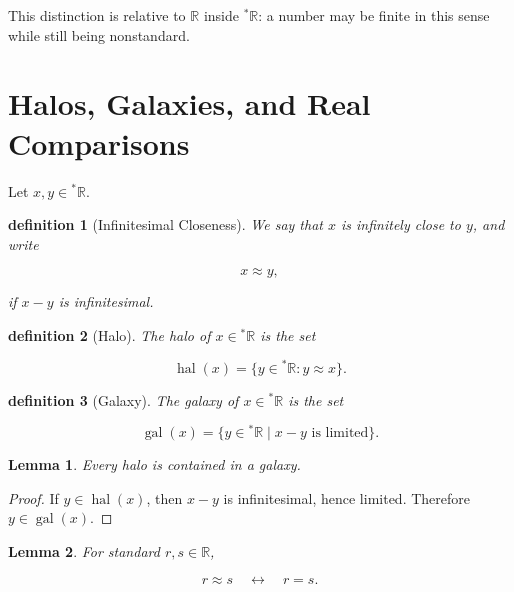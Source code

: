 \documentclass[10pt,a4paper]{book}
\newtheorem{definition}{definition}[section]
\newtheorem{lemma}{Lemma}[section]
\begin{document}
This distinction is relative to \(\mathbb R\) inside \({}^\ast\mathbb R\): a
number may be finite in this sense while still being nonstandard.

\section{Halos, Galaxies, and Real Comparisons}

Let \(x,y\in{}^\ast\mathbb R\).

\begin{definition}[Infinitesimal Closeness]

    We say that \(x\) is \emph{infinitely close} to \(y\), and write

    $$
        x\approx y,
    $$

    if \(x-y\) is infinitesimal.

\end{definition}

\begin{definition}[Halo]

    The \emph{halo} of \(x\in{}^\ast\mathbb R\) is the set

    $$
        \operatorname{hal}(x)
        =
        \{y\in{}^\ast\mathbb R:y\approx x\}.
    $$

\end{definition}

\begin{definition}[Galaxy]

    The \emph{galaxy} of \(x\in{}^\ast\mathbb R\) is the set

    $$
        \operatorname{gal}(x)
        =
        \{y\in{}^\ast\mathbb R \mid x-y\text{ is limited}\}.
    $$

\end{definition}

\begin{lemma}

    Every halo is contained in a galaxy.

\end{lemma}

\begin{proof}

    If \(y\in\operatorname{hal}(x)\), then \(x-y\) is infinitesimal, hence limited.
    Therefore \(y\in\operatorname{gal}(x)\).

\end{proof}

\begin{lemma}

    For standard \(r,s\in\mathbb R\),

    $$
        r\approx s
        \quad\leftrightarrow\quad
        r=s.
    $$

\end{lemma}
\end{document}
